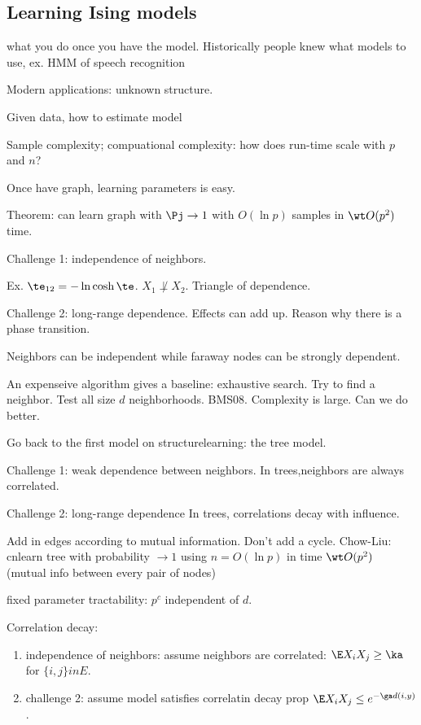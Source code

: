 \subsection{Learning Ising models}
what you do once you have the model. Historically people knew what models to use, ex. HMM of speech recognition

Modern applications: unknown structure.

Given data, how to estimate model

Sample complexity; compuational complexity: how does run-time scale with $p$ and $n$?

Once have graph, learning parameters is easy.

Theorem: can learn graph with $\Pj\to 1$ with $O(\ln p)$ samples in $\wt O(p^2)$ time.

Challenge 1: independence of neighbors.

Ex. $\te_{12}=-\ln \cosh\te$. $X_1\not\perp X_2$.
Triangle of dependence.

Challenge 2: long-range dependence. Effects can add up. Reason why there is a phase transition.

Neighbors can be independent while faraway nodes can be strongly dependent.

An expenseive algorithm gives a baseline: exhaustive search. Try to find a neighbor. Test all size $d$ neighborhoods.
BMS08. Complexity is large. Can we do better.

Go back to the first model on structurelearning: the tree model. 

Challenge 1: weak dependence between neighbors. In trees,neighbors are always correlated.

Challenge 2: long-range dependence In trees, correlations decay with influence. 

Add in edges according to mutual information. Don't add a cycle. Chow-Liu: cnlearn tree with probability $\to 1$ using $n=O(\ln p)$ in time $\wt O(p^2)$ (mutual info between every pair of nodes)

%
%

fixed parameter tractability: $p^c$ independent of $d$.

Correlation decay: 
\begin{enumerate}
\item
independence of neighbors: assume neighbors are correlated: $\E X_iX_j\ge \ka$ for $\{i,j\}in E$.
\item
challenge 2: assume model satisfies correlatin decay prop $\E X_iX_j\le e^{-\ga d(i,y)}$.
\end{enumerate}

